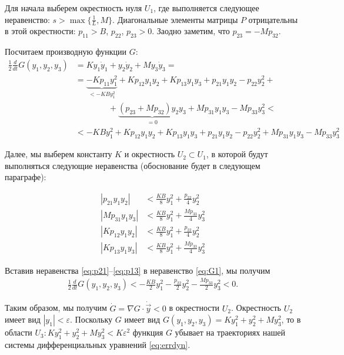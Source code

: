 \documentclass{article}
\begin{document}
Для начала выберем окрестность нуля $U_1$, где выполняется следующее неравенство: $s>\max\{\frac{1}{L}, M\}$.
Диагональные элементы матрицы $P$ отрицательны в этой окрестности: $p_{11}>B$, $p_{22}$, $p_{23}>0$.
Заодно заметим, что $p_{23}=-Mp_{32}$.

Посчитаем производную функции $G$:
\begin{align}
\frac{1}{2}\frac{d}{dt} G(y_1,y_2,y_3) &= Ky_1\dot y_1 + y_2\dot y_2 + My_3\dot y_3 = \nonumber \\
& = \underbrace{-Kp_{11}y_1^2}_{<-KBy_1^2}+Kp_{12}y_1y_2+Kp_{13}y_1y_3+p_{21}y_1y_2-p_{22}y_2^2+ \nonumber \\
& \qquad \qquad + \underbrace{(p_{23}+Mp_{32})y_2y_3}_{=0}+Mp_{31}y_1y_3-Mp_{33}y_3^2  <\nonumber \\
& < -KBy_1^2+Kp_{12}y_1y_2+Kp_{13}y_1y_3+p_{21}y_1y_2-p_{22}y_2^2+Mp_{31}y_1y_3-Mp_{33}y_3^2 \label{eq:G1}
\end{align}

Далее, мы выберем константу $K$ и окрестность $U_2\subset U_1$, в которой будут выполняться следующие неравенства (обоснование будет в следующем параграфе):

\begin{align}
|p_{21}y_1y_2|  & < \frac{KB}{8}y_1^2+\frac{p_{22}}{4}y_2^2  \label{eq:p21} \\
|Mp_{31}y_1y_3| & < \frac{KB}{8}y_1^2+\frac{Mp_{33}}{4}y_3^2 \label{eq:p31} \\
|Kp_{12}y_1y_2| & < \frac{KB}{8}y_1^2+\frac{p_{22}}{4}y_2^2  \label{eq:p12} \\
|Kp_{13}y_1y_3| & < \frac{KB}{8}y_1^2+\frac{Mp_{33}}{4}y_3^2 \label{eq:p13}
\end{align}

Вставив неравенства \eqref{eq:p21}--\eqref{eq:p13} в неравенство \eqref{eq:G1}, мы получим
\begin{align*}
\frac{1}{2}\frac{d}{dt} G(y_1,y_2,y_3) < -\frac{KB}{2}y_1^2-\frac{p_{22}}{2}y_2^2-\frac{Mp_{33}}2 y_3^2 < 0.
\end{align*}

Таким образом, мы получим $\dot{G} = \nabla G \cdot \dot{\vec{y}} < 0$ в окрестности $U_2$.
Окрестность $U_2$ имеет вид $|y_1|<\varepsilon$.
Поскольку $G$ имеет вид $G(y_1,y_2,y_3)=K y_1^2+ y_2^2 + M y_3^2$, то в области $U_3: K y_1^2+ y_2^2 + M y_3^2 < K\varepsilon^2$ 
функция $G$ убывает на траекториях нашей системы дифференциальных уравнений \eqref{eq:errdyn}.
\end{document}

